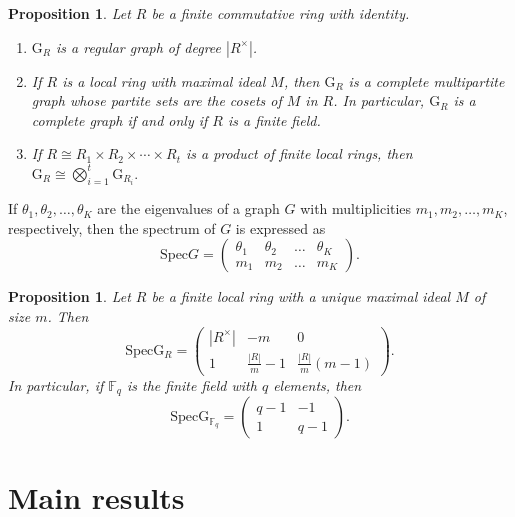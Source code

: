 \documentclass[12pt]{amsart}
\numberwithin{equation}{section}
\newtheorem{prop}[thm]{Proposition}
\theoremstyle{definition}
\theoremstyle{definition} \numberwithin{equation}{section}
\newcommand{\G}{\mathrm{G}}
\newcommand{\Spec}{\mathrm{Spec}}
\begin{document}
\begin{prop}\label{graph}
    \cite[Proposition 2.2]{AR} Let $R$ be a finite commutative ring with identity.
    \begin{enumerate}[label=(\roman*)]
        \item $\G_R$ is a regular graph of degree $|R^ \times|$.
        \item If $R$ is a local ring with maximal ideal $M$, then $\G_R$ is a complete multipartite graph whose partite sets are the cosets of $M$ in $R$. In particular, $\G_R$ is a complete graph if and only if $R$ is a finite field.
        \item If $R \cong R_1 \times R_2 \times \cdots \times R_t$ is a product of finite local rings, then $\G_R \cong \bigotimes_{i=1}^{t}\G_{R_i}.$
    \end{enumerate}
\end{prop}

If $\theta_1, \theta_2,\ldots,\theta_K$ are the eigenvalues of a graph $G$ with multiplicities $m_1, m_2,\ldots, m_K$, respectively, then the spectrum of $G$ is expressed as 
$$
\Spec G =\left(
    \begin{array}{cccc}
    \theta_1 & \theta_2 & \ldots & \theta_K \\
    m_1 & m_2 & \ldots & m_K
    \end{array}
    \right). 
$$

\begin{prop}\label{specG_R} \cite[Proposition 2.1]{KD} 
    Let $R$ be a finite local ring with a unique maximal ideal $M$ of size $m$. Then
    \begin{equation*}
        \Spec \G_R = \left(
    \begin{array}{ccc}
    |R^\times| & -m & 0\\
   1 & \frac{|R|}{m}-1 & \frac{|R|}{m}(m-1)
    \end{array}
    \right) .
    \end{equation*}
    In particular, if $\mathbb{F}_q$ is the finite field with $q$ elements, then
    \begin{equation*}
       \Spec \G_{\mathbb{F}_q} = \left(
    \begin{array}{cc}
    q-1 & -1 \\
   1 & q-1
    \end{array}
    \right).
    \end{equation*}
\end{prop}

\section{Main results} 
\end{document}
